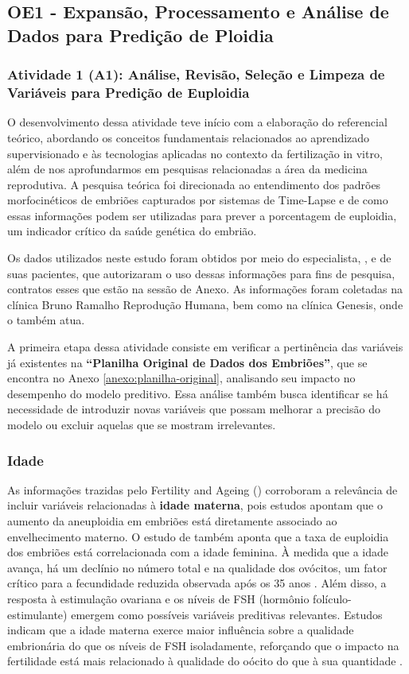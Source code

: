 \subsection{OE1 - Expansão, Processamento e Análise de Dados para Predição de Ploidia}
\subsubsection{Atividade 1 (A1): Análise, Revisão, Seleção e Limpeza de Variáveis para Predição de Euploidia}
O desenvolvimento dessa atividade teve início com a elaboração do referencial teórico, abordando os conceitos fundamentais relacionados ao aprendizado supervisionado e às tecnologias aplicadas no contexto da fertilização in vitro, além de nos aprofundarmos em pesquisas relacionadas a área da medicina reprodutiva. A pesquisa teórica foi direcionada ao entendimento dos padrões morfocinéticos de embriões capturados por sistemas de Time-Lapse e de como essas informações podem ser utilizadas para prever a porcentagem de euploidia, um indicador crítico da saúde genética do embrião.

Os dados utilizados neste estudo foram obtidos por meio do especialista, , e de suas pacientes, que autorizaram o uso dessas informações para fins de pesquisa, contratos esses que estão na sessão de Anexo. As informações foram coletadas na clínica Bruno Ramalho Reprodução Humana, bem como na clínica Genesis, onde o  também atua.

A primeira etapa dessa atividade consiste em verificar a pertinência das variáveis já existentes na \textbf{“Planilha Original de Dados dos Embriões”}, que se encontra no Anexo \ref{anexo:planilha-original}, analisando seu impacto no desempenho do modelo preditivo. Essa análise também busca identificar se há necessidade de introduzir novas variáveis que possam melhorar a precisão do modelo ou excluir aquelas que se mostram irrelevantes.

\subsubsection{Idade}
As informações trazidas pelo Fertility and Ageing () corroboram a relevância de incluir variáveis relacionadas à \textbf{idade materna}, pois estudos apontam que o aumento da aneuploidia em embriões está diretamente associado ao envelhecimento materno. O estudo de  também aponta que a taxa de euploidia dos embriões está correlacionada com a idade feminina. À medida que a idade avança, há um declínio no número total e na qualidade dos ovócitos, um fator crítico para a fecundidade reduzida observada após os 35 anos \cite{yuan2023}. Além disso, a resposta à estimulação ovariana e os níveis de FSH (hormônio folículo-estimulante) emergem como possíveis variáveis preditivas relevantes. Estudos indicam que a idade materna exerce maior influência sobre a qualidade embrionária do que os níveis de FSH isoladamente, reforçando que o impacto na fertilidade está mais relacionado à qualidade do oócito do que à sua quantidade \cite{eshre2005}.

